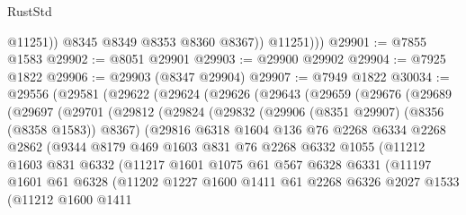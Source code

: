 \begin{lexlean}{RustStd}
\begin{coremodule}
{\begin{coremodule}
{{{{{{{{{{{{{{{{{{{{{{{{{{{{{{{{{{{{{{{{{{{{{{{{{{{{{{                  @11251))
              @8345
              @8349
              @8353
              @8360
              @8367))
          @11251)))
@29901 := @7855 @1583
@29902 := @8051 @29901
@29903 := @29900 @29902
@29904 := @7925 @1822
@29906 := @29903 (@8347 @29904)
@29907 := @7949 @1822
@30034 := @29556
    (@29581
      (@29622
        (@29624
          (@29626
            (@29643
              (@29659
                (@29676
                  (@29689
                    (@29697
                      (@29701
                        (@29812
                          (@29824
                            (@29832
                              (@29906 (@8351 @29907) (@8356 (@8358 @1583)) @8367)
                              (@29816
                                @6318
                                @1604
                                @136
                                @76
                                @2268
                                @6334
                                @2268
                                @2862
                                (@9344
                                  @8179
                                  @469
                                  @1603
                                  @831
                                  @76
                                  @2268
                                  @6332
                                  @1055
                                  (@11212
                                    @1603
                                    @831
                                    @6332
                                    (@11217
                                      @1601
                                      @1075
                                      @61
                                      @567
                                      @6328
                                      @6331
                                      (@11197
                                        @1601
                                        @61
                                        @6328
                                        (@11202
                                          @1227
                                          @1600
                                          @1411
                                          @61
                                          @2268
                                          @6326
                                          @2027
                                          @1533
                                          (@11212
                                            @1600
                                            @1411
}}}}}}}}}}}}}}}}}}}}}}}}}}}}}}}}}}}}}}}}}}}}}}}}}}}}}}
\end{coremodule}}
\end{coremodule}
\end{lexlean}
